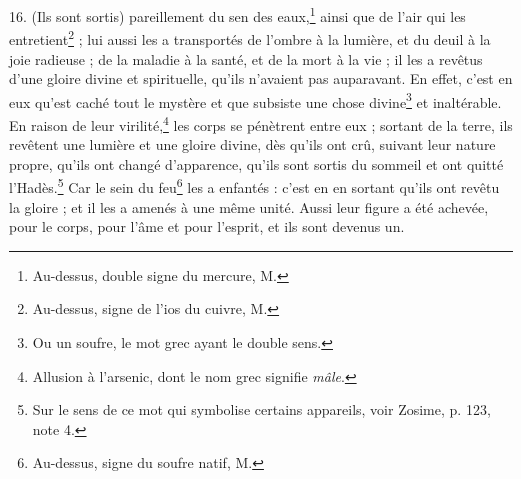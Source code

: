 \documentclass[a4paper, 11pt, oneside, polutonikogreek, french]{article}
\begin{document}
16. (Ils sont sortis) pareillement du sen des eaux,\footnote{Au-dessus, double signe du mercure, M.} ainsi que de l'air qui les entretient\footnote{Au-dessus, signe de l'ios du cuivre, M.} ; lui aussi les a transportés de l'ombre à la lumière, et du deuil à la joie radieuse ; de la maladie à la santé, et de la mort à la vie ; il les a revêtus d'une gloire divine et spirituelle, qu'ils n'avaient pas auparavant. En effet, c'est en eux qu'est caché tout le mystère et que subsiste une chose divine\footnote{Ou un soufre, le mot grec ayant le double sens.} et inaltérable. En raison de leur virilité,\footnote{Allusion à l'arsenic, dont le nom grec signifie \emph{mâle}.} les corps se pénètrent entre eux ; sortant de la terre, ils revêtent une lumière et une gloire divine, dès qu'ils ont crû, suivant leur nature propre, qu'ils ont changé d'apparence, qu'ils sont sortis du sommeil et ont quitté l'Hadès.\footnote{Sur le sens de ce mot qui symbolise certains appareils, voir Zosime, p. 123, note 4.} Car le sein du feu\footnote{Au-dessus, signe du soufre natif, M.} les a enfantés : c'est en en sortant qu'ils ont revêtu la gloire ; et il les a amenés à une même unité. Aussi leur figure a été achevée, pour le corps, pour l'âme et pour l'esprit, et ils sont devenus un.
\end{document}
